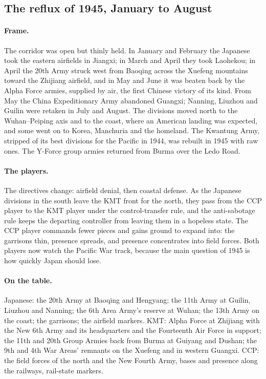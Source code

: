 \documentclass[11pt]{article}
\begin{document}
\clearpage
{}
\subsection{The reflux of 1945, January to August}
\paragraph{Frame.} The corridor was open but thinly held. In January and February the Japanese took the eastern airfields in Jiangxi; in March and April they took Laohekou; in April the 20th Army struck west from Baoqing across the Xuefeng mountains toward the Zhijiang airfield, and in May and June it was beaten back by the Alpha Force armies, supplied by air, the first Chinese victory of its kind. From May the China Expeditionary Army abandoned Guangxi; Nanning, Liuzhou and Guilin were retaken in July and August. The divisions moved north to the Wuhan--Peiping axis and to the coast, where an American landing was expected, and some went on to Korea, Manchuria and the homeland. The Kwantung Army, stripped of its best divisions for the Pacific in 1944, was rebuilt in 1945 with raw ones. The Y-Force group armies returned from Burma over the Ledo Road.
\paragraph{The players.} The directives change: airfield denial, then coastal defense. As the Japanese divisions in the south leave the KMT front for the north, they pass from the CCP player to the KMT player under the control-transfer rule, and the anti-sabotage rule keeps the departing controller from leaving them in a hopeless state. The CCP player commands fewer pieces and gains ground to expand into: the garrisons thin, presence spreads, and presence concentrates into field forces. Both players now watch the Pacific War track, because the main question of 1945 is how quickly Japan should lose.
\paragraph{On the table.} Japanese: the 20th Army at Baoqing and Hengyang; the 11th Army at Guilin, Liuzhou and Nanning; the 6th Area Army's reserve at Wuhan; the 13th Army on the coast; the garrisons; the airfield markers. KMT: Alpha Force at Zhijiang with the New 6th Army and its headquarters and the Fourteenth Air Force in support; the 11th and 20th Group Armies back from Burma at Guiyang and Dushan; the 9th and 4th War Areas' remnants on the Xuefeng and in western Guangxi. CCP: the field forces of the north and the New Fourth Army, bases and presence along the railways, rail-state markers.
\end{document}
